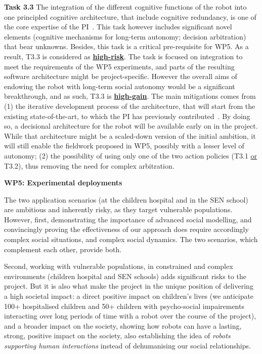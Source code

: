 \begin{rewrite}
\textbf{Task 3.3} The integration of the different cognitive functions of the
robot into one principled cognitive architecture, that include cognitive
redundancy, is one of the core expertise of the
PI~\cite{lemaignan2017artificial}. This task however includes significant novel
elements (cognitive mechanisms for long-term autonomy; decision arbitration)
that bear unknowns. Besides, this task is a critical pre-requisite for WP5. As a
result, T3.3 is considered as \ul{\bf high-risk}. The task is focused on
integration to meet the requirements of the WP5 experiments, and parts
of the resulting software architecture might be project-specific. However the
overall aims of endowing the robot with long-term social autonomy would be a
significant breakthrough, and as such, T3.3 is \ul{\bf high-gain}. The main
mitigations comes from (1) the iterative development process of the
architecture, that will start from the existing state-of-the-art, to which the
PI has previously contributed~\cite{lemaignan2017artificial}. By doing so, a
decisional architecture for the robot will be available early on in the project.
While that architecture might be a scaled-down version of the initial ambition,
it will still enable the fieldwork proposed in WP5, possibly with a lesser level
of autonomy; (2) the possibility of using only one of the two action policies
(T3.1 \ul{or} T3.2), thus removing the need for complex arbitration.

\vspace{1em}

\textbf{WP5: Experimental deployments}

The two application scenarios (at the children hospital and in the SEN school)
are ambitious and inherently risky, as they target vulnerable populations.
However, first, demonstrating the importance of advanced social modelling, and
convincingly proving the effectiveness of our approach does require accordingly
complex social situations, and complex social dynamics. The two scenarios, which
complement each other, provide both.

Second, working with vulnerable populations, in constrained and complex
environments (children hospital and SEN schools) adds significant risks to the
project. But it is also what make the project in the unique position of
delivering a high societal impact: a direct positive impact on children's lives
(we anticipate 100+ hospitalised children and 50+ children with psycho-social
impairements interacting over long periods of time with a robot over the course
of the project), and a broader impact on the society, showing how robots can
have a lasting, strong, positive impact on the society, also establishing the
idea of \emph{robots supporting human interactions} instead of dehumanising our
social relationships.


\end{rewrite}

